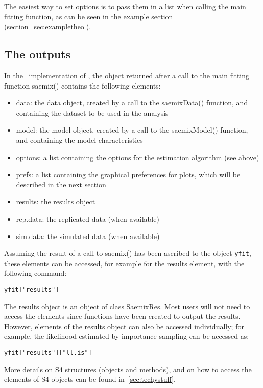 The easiest way to set options is to pass them in a list when calling the main fitting function, as can be seen in the example section (section~\ref{sec:exampletheo}).

\clearpage
\subsection{The outputs}

In the \R~implementation of \monolix, the object returned after a call to the main fitting function {\sf saemix()} contains the following elements:
\begin{itemize}
\item data: the data object, created by a call to the {\sf saemixData()} function, and containing the dataset to be used in the analysis
\item model: the model object, created by a call to the {\sf saemixModel()} function, and containing the model characteristics
\item options: a list containing the options for the estimation algorithm (see above)
\item prefs: a list containing the graphical preferences for plots, which will be described in the next section
\item results: the results object
\item rep.data: the replicated data (when available)
\item sim.data: the simulated data (when available)
\end{itemize}
Assuming the result of a call to {\sf saemix()} has been ascribed to the object \verb+yfit+, these elements can be accessed, for example for the results element, with the following command:
\begin{verbatim}
yfit["results"]
\end{verbatim}
The results object is an object of class {\sf SaemixRes}. Most users will not need to access the elements since functions have been created to output the results. However, elements of the results object can also be accessed individually; for example, the likelihood estimated by importance sampling can be accessed as:
\begin{verbatim}
yfit["results"]["ll.is"]
\end{verbatim}
More details on S4 structures (objects and methods), and on how to access the elements of S4 objects can be found in~\ref{sec:techystuff}.

